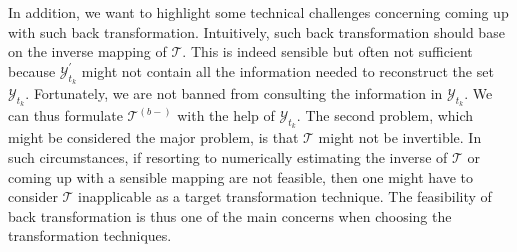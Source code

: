 In addition, we want to highlight some technical challenges concerning coming up with such back transformation. Intuitively, such back transformation should base on the inverse mapping of $\mathcal{T}$. This is indeed sensible but often not sufficient because $\mathcal{Y}^{'}_{t_k}$ might not contain all the information needed to reconstruct the set $\mathcal{Y}_{t_k}$. Fortunately, we are not banned from consulting the information in $\mathcal{Y}_{t_k}$. We can thus formulate $\mathcal{T}^{(b-)}$ with the help of $\mathcal{Y}_{t_k}$. The second problem, which might be considered the major problem, is that $\mathcal{T}$ might not be invertible. In such circumstances, if resorting to numerically estimating the inverse of $\mathcal{T}$ or coming up with a sensible mapping are not feasible, then one might have to consider $\mathcal{T}$ inapplicable as a target transformation technique. The feasibility of back transformation is thus one of the main concerns when choosing the transformation techniques.

